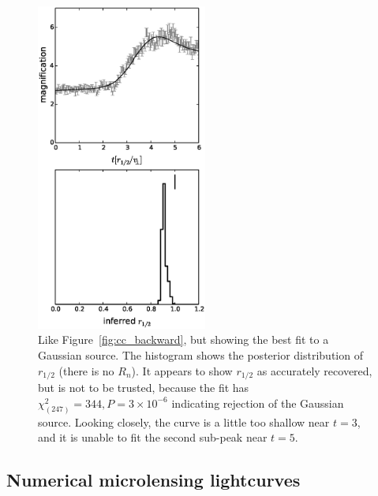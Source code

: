 \documentclass[usenatbib]{mn2e}
\begin{document}
\begin{figure}
\centering
  \includegraphics[width=0.5\textwidth]{figures/gc_forward.eps}
\caption{\label{fig:gc_forward} Like Figure~\ref{fig:cc_backward}, but
  showing the best fit to a Gaussian source.  The histogram shows the
  posterior distribution of $r_{1/2}$ (there is no $R_n$).  It appears
  to show $r_{1/2}$ as accurately recovered, but is not to be trusted,
  because the fit has $\chi^2_{(247)}=344, P=3\times10^{-6}$ indicating
  rejection of the Gaussian source.  Looking closely, the curve is a
  little too shallow near $t=3$, and it is unable to fit the second
  sub-peak near $t=5$.}
\end{figure}

\subsection{Numerical microlensing lightcurves}
\end{document}
